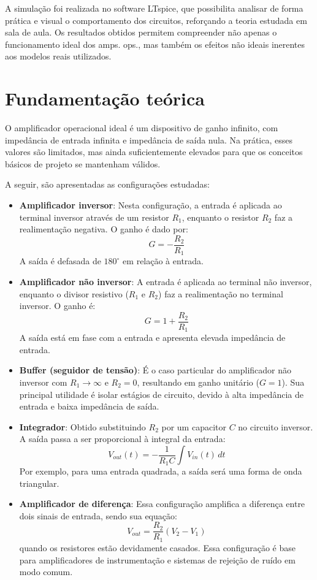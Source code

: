 \documentclass[10pt,twocolumn,letterpaper]{article}
\begin{document}
A simulação foi realizada no software LTspice, que possibilita analisar de forma prática e visual o comportamento dos circuitos, reforçando a teoria estudada em sala de aula. Os resultados obtidos permitem compreender não apenas o funcionamento ideal dos amps. ops., mas também os efeitos não ideais inerentes aos modelos reais utilizados.

\section{Fundamentação teórica}

O amplificador operacional ideal é um dispositivo de ganho infinito, com impedância de entrada infinita e impedância de saída nula. Na prática, esses valores são limitados, mas ainda suficientemente elevados para que os conceitos básicos de projeto se mantenham válidos.

A seguir, são apresentadas as configurações estudadas:

\begin{itemize}
    \item \textbf{Amplificador inversor}: Nesta configuração, a entrada é aplicada ao terminal inversor através de um resistor $R_1$, enquanto o resistor $R_2$ faz a realimentação negativa. O ganho é dado por:
    \[
    G = -\frac{R_2}{R_1}
    \]
    A saída é defasada de $180^\circ$ em relação à entrada.

    \item \textbf{Amplificador não inversor}: A entrada é aplicada ao terminal não inversor, enquanto o divisor resistivo ($R_1$ e $R_2$) faz a realimentação no terminal inversor. O ganho é:
    \[
    G = 1 + \frac{R_2}{R_1}
    \]
    A saída está em fase com a entrada e apresenta elevada impedância de entrada.

    \item \textbf{Buffer (seguidor de tensão)}: É o caso particular do amplificador não inversor com $R_1 \to \infty$ e $R_2 = 0$, resultando em ganho unitário ($G=1$). Sua principal utilidade é isolar estágios de circuito, devido à alta impedância de entrada e baixa impedância de saída.

    \item \textbf{Integrador}: Obtido substituindo $R_2$ por um capacitor $C$ no circuito inversor. A saída passa a ser proporcional à integral da entrada:
    \[
    V_{out}(t) = -\frac{1}{R_1 C} \int V_{in}(t) \, dt
    \]
    Por exemplo, para uma entrada quadrada, a saída será uma forma de onda triangular.

    \item \textbf{Amplificador de diferença}: Essa configuração amplifica a diferença entre dois sinais de entrada, sendo sua equação:
    \[
    V_{out} = \frac{R_2}{R_1}(V_2 - V_1)
    \]
    quando os resistores estão devidamente casados. Essa configuração é base para amplificadores de instrumentação e sistemas de rejeição de ruído em modo comum.
\end{itemize}
\end{document}
